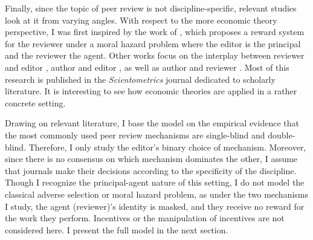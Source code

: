 \documentclass[12pt]{article}
\begin{document}
Finally, since the topic of peer review is not discipline-specific, relevant
studies look at it from varying angles. With respect to the more economic
theory perspective, I was first inspired by the work of
\citet{garcia2015principal}, which proposes a reward system for the reviewer
under a moral hazard problem where the editor is the principal and the reviewer
the agent. Other works focus on the interplay between reviewer and editor
\citep{garcia2021interplay}, author and editor \cite{garcia2022fraud}, as well
as author and reviewer \citep{radzvilas2023incentives}. Most of this research
is published in the \textit{Scientometrics} journal dedicated to scholarly
literature. It is interesting to see how economic theories are applied in a
rather concrete setting.

Drawing on relevant literature, I base the model on the empirical evidence that
the most commonly used peer review mechanisms are single-blind and
double-blind. Therefore, I only study the editor's binary choice of mechanism.
Moreover, since there is no consensus on which mechanism dominates the other, I
assume that journals make their decisions according to the specificity of the
discipline. Though I recognize the principal-agent nature of this setting, I do
not model the classical adverse selection or moral hazard problem, as under the
two mechanisms I study, the agent (reviewer)'s identity is masked, and they
receive no reward for the work they perform. Incentives or the manipulation of
incentives are not considered here. I present the full model in the next
section.
\end{document}
